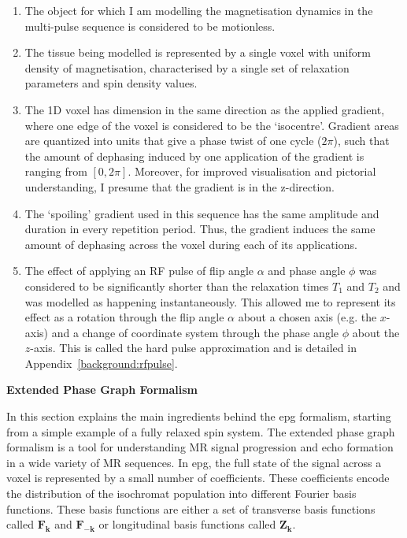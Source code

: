 \begin{enumerate}

    \item The object for which I am modelling the magnetisation dynamics in the multi-pulse sequence is considered to be motionless.

    \item The tissue being modelled is represented by a single voxel with uniform density of magnetisation, characterised by a single set of relaxation parameters and spin density values.
    
    \item The 1D voxel has dimension in the same direction as the applied gradient, where one edge of the voxel is considered to be the `isocentre'.
    Gradient areas are quantized into units that give a phase twist of one cycle ($2\pi$), such that the amount of dephasing induced by one application of the gradient is ranging from $[0, 2\pi]$. 
    Moreover, for improved visualisation and pictorial understanding, I presume that the gradient is in the z-direction.

    \item The `spoiling' gradient used in this sequence has the same amplitude and duration in every repetition period.
    Thus, the gradient induces the same amount of dephasing across the voxel during each of its applications.
    
    \item The effect of applying an RF pulse of flip angle $\alpha$ and phase angle $\phi$ was considered to be significantly shorter than the relaxation times $T_1$ and $T_2$ and was modelled as happening instantaneously.
    This allowed me to represent its effect as a rotation through the flip angle $\alpha$ about a chosen axis (e.g. the $x$-axis) and a change of coordinate system through the phase angle $\phi$ about the $z$-axis.
    This is called the hard pulse approximation and is detailed in Appendix~\ref{background:rfpulse}.

\end{enumerate}

\hfill

\large \textbf{Extended Phase Graph Formalism} \normalsize

In this section explains the main ingredients behind the \ac{epg} formalism, starting from a simple example of a fully relaxed spin system.
The extended phase graph formalism is a tool for understanding MR signal progression and echo formation in a wide variety of MR sequences.
In \ac{epg}, the full state of the signal across a voxel is represented by a small number of coefficients.
These coefficients encode the distribution of the isochromat population into different Fourier basis functions.
These basis functions are either a set of transverse basis functions called $\bm{F_k}$ and $\bm{F_{-k}}$ or longitudinal basis functions called $\bm{Z_k}$.

